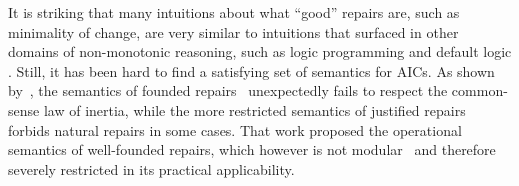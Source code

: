 
It is striking that many intuitions about what ``good'' repairs are, such as minimality of change, are very similar to intuitions that surfaced in other domains of non-monotonic reasoning, such as logic programming  and default logic . 
Still, it has been hard to find a satisfying set of semantics for AICs.
As shown by~\citet{tase/Cruz-FilipeEGN13}, the semantics of founded repairs~\cite{iclp/CaropreseGSZ06} unexpectedly fails to respect the common-sense law of inertia, while the more restricted semantics of justified repairs~\cite{tplp/CaropreseT11} forbids natural repairs in some cases.
That work proposed the operational semantics of well-founded repairs, which however is not modular~\cite{foiks/Cruz-Filipe14} and therefore severely restricted in its practical applicability.



